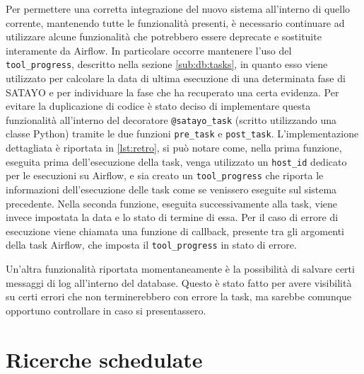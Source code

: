 Per permettere una corretta integrazione del nuovo sistema all'interno di quello
corrente, mantenendo tutte le funzionalità presenti, è necessario continuare ad utilizzare
alcune funzionalità che potrebbero essere deprecate e sostituite interamente da Airflow.
In particolare occorre mantenere l'uso del \texttt{tool\_progress}, descritto
nella sezione \ref{sub:db:tasks}, in quanto esso viene utilizzato per calcolare la
data di ultima esecuzione di una determinata fase di SATAYO e per individuare la
fase che ha recuperato una certa evidenza. Per evitare la duplicazione di codice
è stato deciso di implementare questa funzionalità all'interno del decoratore
\texttt{@satayo\_task} (scritto utilizzando una classe Python) tramite le due funzioni
\texttt{pre\_task} e \texttt{post\_task}. L'implementazione dettagliata è
riportata in \ref{lst:retro}, si può notare come, nella prima funzione, eseguita
prima dell'esecuzione della task, venga utilizzato un \texttt{host\_id} dedicato
per le esecuzioni su Airflow, e sia creato un \texttt{tool\_progress} che riporta
le informazioni dell'esecuzione delle task come se venissero eseguite sul sistema
precedente. Nella seconda funzione, eseguita successivamente alla task, viene
invece impostata la data e lo stato di termine di essa. Per il caso di errore di
esecuzione viene chiamata una funzione di callback, presente tra gli argomenti
della task Airflow, che imposta il \texttt{tool\_progress} in stato di errore.

Un'altra funzionalità riportata momentaneamente è la possibilità di salvare
certi messaggi di log all'interno del database. Questo è stato fatto per avere visibilità
su certi errori che non terminerebbero con errore la task, ma sarebbe comunque
opportuno controllare in caso si presentassero.



\section{Ricerche schedulate}
\label{sec:schedulate}

